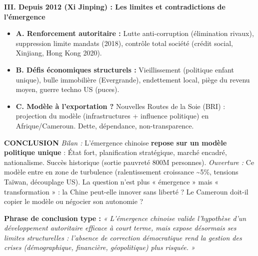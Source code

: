 \documentclass[11pt]{article}
\begin{document}
\begin{exoresolu}
\textbf{III. Depuis 2012 (Xi Jinping) : Les limites et contradictions de l'émergence}
\begin{itemize}
    \item \textbf{A. Renforcement autoritaire :} Lutte anti-corruption (élimination rivaux), suppression limite mandats (2018), contrôle total société (crédit social, Xinjiang, Hong Kong 2020).
    \item \textbf{B. Défis économiques structurels :} Vieillissement (politique enfant unique), bulle immobilière (Evergrande), endettement local, piège du revenu moyen, guerre techno US (puces).
    \item \textbf{C. Modèle à l'exportation ?} Nouvelles Routes de la Soie (BRI) : projection du modèle (infrastructures + influence politique) en Afrique/Cameroun. Dette, dépendance, non-transparence.
\end{itemize}

\textbf{CONCLUSION}
\textit{Bilan :} L'émergence chinoise \textbf{repose sur un modèle politique unique} : État fort, planification stratégique, marché encadré, nationalisme. Succès historique (sortie pauvreté 800M personnes).
\textit{Ouverture :} Ce modèle entre en zone de turbulence (ralentissement croissance \textasciitilde \num{5}\%, tensions Taïwan, découplage US). La question n'est plus « émergence » mais « transformation » : la Chine peut-elle innover sans liberté ? Le Cameroun doit-il copier le modèle ou négocier son autonomie ?

\textbf{Phrase de conclusion type :} \emph{« L'émergence chinoise valide l'hypothèse d'un développement autoritaire efficace à court terme, mais expose désormais ses limites structurelles : l'absence de correction démocratique rend la gestion des crises (démographique, financière, géopolitique) plus risquée. »}
\end{exoresolu}
\end{document}
